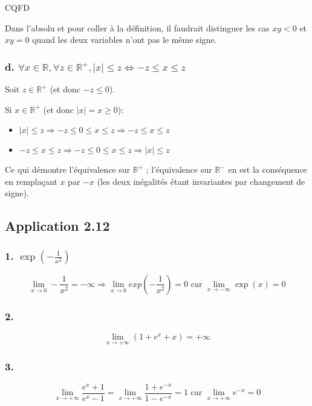 \documentclass{report}
\begin{document}
CQFD

Dans l'absolu et pour coller à la définition, il faudrait distinguer les cas $xy<0$ et $xy=0$ quand les deux variables n'ont pas
le même signe.


\subsubsection*{d. $\forall x \in \mathbb{R}, \forall z \in \mathbb{R}^{+}, |x| \leq z \Longleftrightarrow -z \leq x \leq z$}

Soit $z \in \mathbb{R}^{+}$ (et donc $-z \leq 0$).

Si $x \in \mathbb{R}^{+}$ (et donc $|x|=x \geq 0$):

\begin{itemize}
	\item $|x| \leq z \Longrightarrow -z \leq 0 \leq x \leq z \Longrightarrow -z \leq x \leq z$
	\item $-z \leq x \leq z \Longrightarrow -z \leq 0 \leq x \leq z \Longrightarrow |x| \leq z$
\end{itemize}

Ce qui démontre l'équivalence sur $\mathbb{R}^{+}$ ; l'équivalence sur $\mathbb{R}^{-}$ en est la conséquence
en remplaçant $x$ par $-x$ (les deux inégalités étant invariantes par changement de signe).

\subsection*{Application 2.12}

\subsubsection*{1. $\exp(-\frac{1}{x^2})$}
\begin{displaymath}
	\lim_{x \rightarrow 0} -\frac{1}{x^2} =-\infty \Longrightarrow 	\lim_{x \rightarrow 0} exp(-\frac{1}{x^2})= 0 \text{ car } \lim_{x \rightarrow -\infty} \exp(x) = 0
\end{displaymath}

\subsubsection*{2.}
\begin{displaymath}
	\lim_{x \rightarrow +\infty} (1 + e^x + x)= +\infty
\end{displaymath}

\subsubsection*{3.}
\begin{displaymath}
	\lim_{x \rightarrow +\infty} \frac{e^x+1}{e^x-1}= \lim_{x \rightarrow +\infty} \frac{1+e^{-x}}{1-e^{-x}} = 1 \text{ car }
	\lim_{x \rightarrow +\infty} e^{-x} = 0
\end{displaymath}
\end{document}
